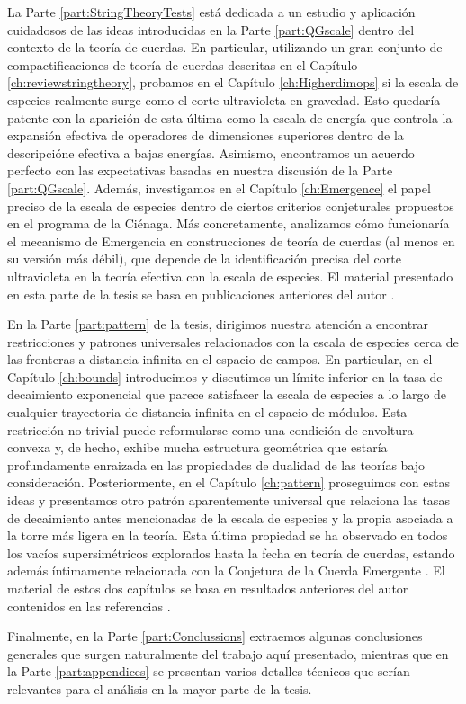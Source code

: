 La Parte \ref{part:StringTheoryTests} está dedicada a un estudio y aplicación cuidadosos de las ideas introducidas en la Parte \ref{part:QGscale} dentro del contexto de la teoría de cuerdas. En particular, utilizando un gran conjunto de compactificaciones de teoría de cuerdas descritas en el Capítulo \ref{ch:reviewstringtheory}, probamos en el Capítulo \ref{ch:Higherdimops} si la escala de especies realmente surge como el corte ultravioleta en gravedad. Esto quedaría patente con la aparición de esta última como la escala de energía que controla la expansión efectiva de operadores de dimensiones superiores dentro de la descripcióne efectiva a bajas energías. Asimismo, encontramos un acuerdo perfecto con las expectativas basadas en nuestra discusión de la Parte \ref{part:QGscale}. Además, investigamos en el Capítulo \ref{ch:Emergence} el papel preciso de la escala de especies dentro de ciertos criterios conjeturales propuestos en el programa de la Ciénaga. Más concretamente, analizamos cómo funcionaría el mecanismo de Emergencia \cite{Harlow:2015lma, Grimm:2018ohb, Heidenreich:2018kpg, Palti:2019pca} en construcciones de teoría de cuerdas (al menos en su versión más débil), que depende de la identificación precisa del corte ultravioleta en la teoría efectiva con la escala de especies. El material presentado en esta parte de la tesis se basa en publicaciones anteriores del autor \cite{Castellano:2022bvr, Castellano:2023aum}.

En la Parte \ref{part:pattern} de la tesis, dirigimos nuestra atención a encontrar restricciones y patrones universales relacionados con la escala de especies cerca de las fronteras a distancia infinita en el espacio de campos. En particular, en el Capítulo \ref{ch:bounds} introducimos y discutimos un límite inferior en la tasa de decaimiento exponencial que parece satisfacer la escala de especies a lo largo de cualquier trayectoria de distancia infinita en el espacio de módulos. Esta restricción no trivial puede reformularse como una condición de envoltura convexa y, de hecho, exhibe mucha estructura geométrica que estaría profundamente enraizada en las propiedades de dualidad de las teorías bajo consideración. Posteriormente, en el Capítulo \ref{ch:pattern} proseguimos con estas ideas y presentamos otro patrón aparentemente universal que relaciona las tasas de decaimiento antes mencionadas de la escala de especies y la propia asociada a la torre más ligera en la teoría. Esta última propiedad se ha observado en todos los vacíos supersimétricos explorados hasta la fecha en teoría de cuerdas, estando además íntimamente relacionada con la Conjetura de la Cuerda Emergente \cite{Lee:2019wij}. El material de estos dos capítulos se basa en resultados anteriores del autor contenidos en las referencias \cite{Calderon-Infante:2023ler, Castellano:2023jjt, PhysRevLett.132.181601}.

Finalmente, en la Parte \ref{part:Conclussions} extraemos algunas conclusiones generales que surgen naturalmente del trabajo aquí presentado, mientras que en la Parte \ref{part:appendices} se presentan varios detalles técnicos que serían relevantes para el análisis en la mayor parte de la tesis.






